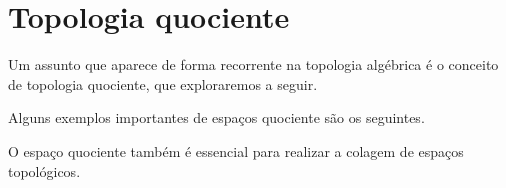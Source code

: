 \section{Topologia quociente}
\label{topologia-quociente}
Um assunto que aparece de forma recorrente na topologia algébrica é o conceito de topologia quociente, que exploraremos a seguir. 



Alguns exemplos importantes de espaços quociente são os seguintes.



O espaço quociente também é essencial para realizar a colagem de espaços topológicos.






